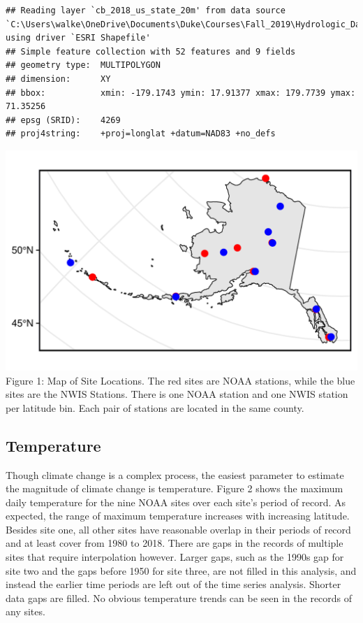 \documentclass[12pt,]{article}
\begin{document}
\begin{verbatim}
## Reading layer `cb_2018_us_state_20m' from data source `C:\Users\walke\OneDrive\Documents\Duke\Courses\Fall_2019\Hydrologic_Data_Analysis\Alaska_DBPs\DATA\RAW\cb_2018_us_state_20m.shp' using driver `ESRI Shapefile'
## Simple feature collection with 52 features and 9 fields
## geometry type:  MULTIPOLYGON
## dimension:      XY
## bbox:           xmin: -179.1743 ymin: 17.91377 xmax: 179.7739 ymax: 71.35256
## epsg (SRID):    4269
## proj4string:    +proj=longlat +datum=NAD83 +no_defs
\end{verbatim}

\includegraphics{Project_Report_v2_files/figure-latex/unnamed-chunk-1-1.pdf}
Figure 1: Map of Site Locations. The red sites are NOAA stations, while
the blue sites are the NWIS Stations. There is one NOAA station and one
NWIS station per latitude bin. Each pair of stations are located in the
same county.

\hypertarget{temperature}{%
\subsection{Temperature}\label{temperature}}

Though climate change is a complex process, the easiest parameter to
estimate the magnitude of climate change is temperature. Figure 2 shows
the maximum daily temperature for the nine NOAA sites over each site's
period of record. As expected, the range of maximum temperature
increases with increasing latitude. Besides site one, all other sites
have reasonable overlap in their periods of record and at least cover
from 1980 to 2018. There are gaps in the records of multiple sites that
require interpolation however. Larger gaps, such as the 1990s gap for
site two and the gaps before 1950 for site three, are not filled in this
analysis, and instead the earlier time periods are left out of the time
series analysis. Shorter data gaps are filled. No obvious temperature
trends can be seen in the records of any sites.
\end{document}
